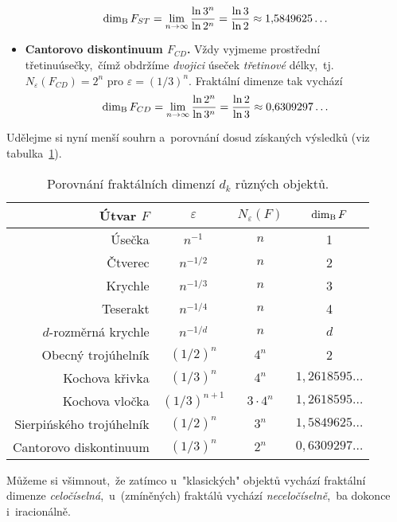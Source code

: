 \begin{itemize}
    \begin{equation}\label{eq:sierpinskeho-trojuhelnik-dimenze}
        \operatorname{dim_B}{F_{ST}}=\lim_{n\to\infty}{\dfrac{\ln{3^n}}{\ln{2^{n}}}}=\dfrac{\ln{3}}{\ln{2}}\approx 1{,}5849625\dots
    \end{equation}
    \item \textbf{Cantorovo diskontinuum $F_{CD}$.} Vždy vyjmeme prostřední třetinu\linebreak{}úsečky,~čímž obdržíme \emph{dvojici} úseček \emph{třetinové} délky,~tj. $N_\varepsilon(F_{CD})=2^n$ pro $\varepsilon=(1/3)^n$. Fraktální dimenze tak vychází
    \begin{equation}\label{eq:cantorovo-diskontinuum-dimenze}
        \operatorname{dim_B}{F_{CD}}=\lim_{n\to\infty}{\dfrac{\ln{2^n}}{\ln{3^n}}}=\dfrac{\ln{2}}{\ln{3}}\approx 0{,}6309297\dots
    \end{equation}
\end{itemize}
Udělejme si nyní menší souhrn a~porovnání dosud získaných výsledků (viz tabulka~\ref{table:fraktaly-eukleides-dimenze}).
\begin{table}[h]
    \centering
    \begin{tabular}{r|ccc}
        Útvar $F$                & $\varepsilon$ & $N_\varepsilon(F)$ & $\operatorname{dim_B}{F}$         \\ \hline
        Úsečka                   & $n^{-1}$      & $n$                & 1                  \\
        Čtverec                  & $n^{-1/2}$    & $n$                & 2                  \\
        Krychle                  & $n^{-1/3}$    & $n$                & 3                  \\
        Teserakt                 & $n^{-1/4}$    & $n$                & 4                  \\
        $d$-rozměrná krychle     & $n^{-1/d}$    & $n$                & $d$                \\
        Obecný trojúhelník       & $(1/2)^n$     & $4^n$              & 2                  \\
        Kochova křivka           & $(1/3)^n$     & $4^n$              & $1{,}2618595\dots$ \\
        Kochova vločka           & $(1/3)^{n+1}$ & $3\cdot 4^n$       & $1{,}2618595\dots$ \\
        Sierpińského trojúhelník & $(1/2)^n$     & $3^n$              & $1{,}5849625\dots$ \\
        Cantorovo diskontinuum   & $(1/3)^n$     & $2^n$              & $0{,}6309297\dots$ \\
    \end{tabular}
    \caption{Porovnání fraktálních dimenzí $d_k$ různých objektů.}
    \label{table:fraktaly-eukleides-dimenze}
\end{table}
Můžeme si všimnout,~že zatímco u~"klasických" objektů vychází fraktální dimenze \emph{celočíselná},~u~(zmíněných) fraktálů vychází \emph{neceločíselně},~ba dokonce i~iracionálně.

